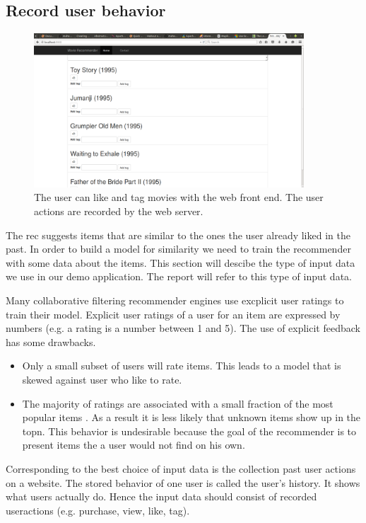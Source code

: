 \subsection{Record user behavior}
\label{sec:inputdata}

\begin{figure}
  \centering
     \includegraphics[width=0.9\textwidth]{collectinginput}
  \caption{The user can like and tag movies with the web front end. The user actions are recorded by the web server.}
  \label{fig:gui}
\end{figure}

The \gls{rec} suggests items that are similar to the ones the user already liked in the past. In order to build a model for similarity we need to train the recommender with some data about the items.
This section will descibe the type of input data we use  in our demo application. The report will refer to this type of input data. 

Many collaborative filtering recommender engines use excplicit user ratings to train their model. Explicit user ratings of a user for an item are expressed by numbers (e.g. a rating is a number between 1 and 5). The use of explicit feedback has some drawbacks.
\begin{itemize}
\item Only a small subset of users will rate items. This leads to a model that is skewed against user who like to rate.
\item The majority of ratings are associated with a small fraction of the most popular items \cite{Anderson}. As a result it is less likely that unknown items show up in the \gls{topn}. This behavior is undesirable because the goal of the recommender is to present items the a user would not find on his own.
\end{itemize}

Corresponding to \cite{Dunning14} the best choice of input data is the collection past user actions on a website. The stored behavior of one user is called the user's \gls{history}. It shows what users actually do. Hence the input data should consist of recorded \glspl{useraction} (e.g. purchase, view, like, tag).

